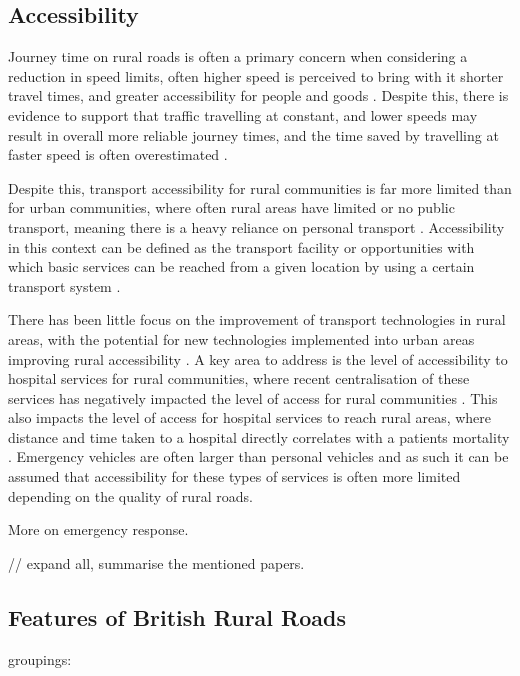 \begin{multicols}{2}
\subsection{Accessibility}

Journey time on rural roads is often a primary concern when considering a reduction in speed limits, often higher speed is perceived to bring with it shorter travel times, and greater accessibility for people and goods \citep{departmentfortransport2013b}. Despite this, there is evidence to support that traffic travelling at constant, and lower speeds may result in overall more reliable journey times, and the time saved by travelling at faster speed is often overestimated \citep{stradling2008}.

Despite this, transport accessibility for rural communities is far more limited than for urban communities, where often rural areas have limited or no public transport, meaning there is a heavy reliance on personal transport \citep{gray2001}. Accessibility in this context can be defined as the transport facility or opportunities with which basic services can be reached from a given location by using a certain transport system \citep{gutierrez2009}.

There has been little focus on the improvement of transport technologies in rural areas, with the potential for new technologies implemented into urban areas improving rural accessibility \citep{velaga2012}. A key area to address is the level of accessibility to hospital services for rural communities, where recent centralisation of these services has negatively impacted the level of access for rural communities \citep{mungall2005}. This also impacts the level of access for hospital services to reach rural areas, where distance and time taken to a hospital directly correlates with a patients mortality \citep{nicholl2007}. Emergency vehicles are often larger than personal vehicles and as such it can be assumed that accessibility for these types of services is often more limited depending on the quality of rural roads.

More on emergency response.

// expand all, summarise the mentioned papers.

\subsection{Features of British Rural Roads}

\citep{taylor2005} groupings:


\end{multicols}
